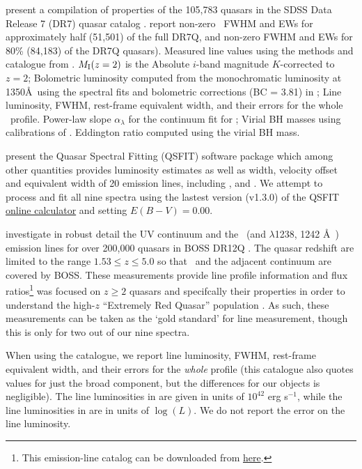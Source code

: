 \documentclass[a4paper,fleqn,usenatbib]{mnras}
\begin{document}
\citet{Shen2011} present a compilation of properties of the 105,783
quasars in the SDSS Data Release 7 (DR7) quasar catalog \citep[DR7Q;
][]{Schneider2007}. \citet{Shen2011} report non-zero \civ\ FWHM and
EWs for approximately half (51,501) of the full DR7Q, and non-zero
\mgii FWHM and EWs for 80\% (84,183) of the DR7Q quasars).
Measured line values using the methods and catalogue from
\citet{Shen2011}.  $M_{\rm I}(z=2)$ is the Absolute $i$-band magnitude
$K$-corrected to $z = 2$; Bolometric luminosity computed from the
monochromatic luminosity at 1350\AA\ using the spectral fits and
bolometric corrections (BC = 3.81) in \citet{Richards2006b}; Line
luminosity, FWHM, rest-frame equivalent width, and their errors for
the whole \civ\ profile.  Power-law slope $\alpha_{\lambda}$ for the
continuum fit for \civ; Virial BH masses using calibrations of
\citet{VestergaardPeterson2006}.  Eddington ratio computed using the
virial BH mass.


\citet{Calderone2017} present the Quasar Spectral Fitting (QSFIT)
software package which among other quantities provides luminosity
estimates as well as width, velocity offset and equivalent width of 20
emission lines, including \civ, \ciii and \mgii.  We attempt to process and fit
all nine spectra using the lastest version (v1.3.0) of the QSFIT
\href{https://qsfit.inaf.it/cat_1.30/onlinefit.php}{online calculator}
and setting $E(B-V)=0.00$.

\citet{Hamann2017} investigate in robust detail the UV continuum and
the \civ\ (and \nv $\lambda$1238, 1242 \AA\ ) emission lines for over
200,000 quasars in BOSS DR12Q \citep{Paris2017}.  The quasar redshift
are limited to the range $1.53 \leq z \leq 5.0$ so that \civ\ and the
adjacent continuum are covered by BOSS. These measurements provide
line profile information and flux ratios\footnote{This emission-line
catalog can be downloaded from
\href{https://datadryad.org/stash/dataset/doi:10.6086/D1H59V}{here}.}
\citet{Hamann2017} was focused on $z\geq2$ quasars and specifcally
their \civ properties in order to understand the high-$z$ ``Extremely
Red Quasar'' population \citet{Ross2015, Zakamska2016, Perrotta2019,
Zakamska2019}.  As such, these measurements can be taken as the `gold
standard' for \civ line measurement, though this is only for two out of
our nine spectra.

 When using the \citet{Shen2011} catalogue, we report line luminosity,
FWHM, rest-frame equivalent width, and their errors for the {\it
whole} \mgii profile (this catalogue also quotes values for just the
broad \mgii component, but the differences for our objects is
negligible). The line luminosities in \citet{Calderone2017} are given
in units of $10^{42}$ erg s$^{-1}$, while the line luminosities in
\citet{Shen2011} are in units of $\log(L)$.  We do not report
the \citet{Shen2011} error on the line luminosity.
\end{document}
